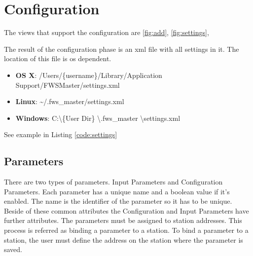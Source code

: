 %

\section{Configuration} %
\label{sec:configuration} 
The views that support the configuration are \ref{fig:add}, \ref{fig:settings}, %

The result of the configuration phase is an xml file with all settings in it. The location of this file is os dependent. 
\begin{itemize}
    \item \textbf{OS X}: /Users/\{username\}/Library/Application Support/FWSMaster/settings.xml
    \item \textbf{Linux}: \textasciitilde /.fws\_master/settings.xml
    \item \textbf{Windows}: C:\textbackslash \{User Dir\} \textbackslash .fws\_master \textbackslash settings.xml
\end{itemize}

See example in Listing \ref{code:settings}

{\C  }

\subsection{Parameters} %
\label{sub:parameters}
There are two types of parameters. Input Parameters and Configuration Parameters. Each parameter has a unique name and a boolean value if it's enabled. The name is the identifier of the parameter so it has to be unique. Beside of these common attributes the Configuration and Input Parameters have further attributes. The parameters must be assigned to station addresses. This process is referred as binding a parameter to a station. To bind a parameter to a station, the user must define the address on the station where the parameter is saved.

